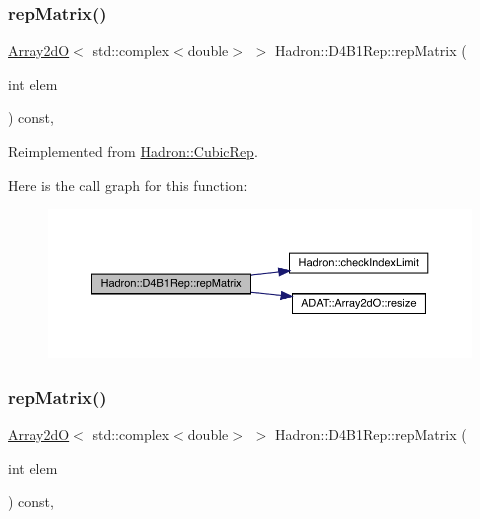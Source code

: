 \subsubsection{\texorpdfstring{repMatrix()}{repMatrix()}\hspace{0.1cm}{\footnotesize\ttfamily [1/2]}}
{\footnotesize\ttfamily \mbox{\hyperlink{classADAT_1_1Array2dO}{Array2dO}}$<$ std\+::complex$<$double$>$ $>$ Hadron\+::\+D4\+B1\+Rep\+::rep\+Matrix (\begin{DoxyParamCaption}\item[{int}]{elem }\end{DoxyParamCaption}) const\hspace{0.3cm}{\ttfamily [inline]}, {\ttfamily [virtual]}}



Reimplemented from \mbox{\hyperlink{structHadron_1_1CubicRep_ac5d7e9e6f4ab1158b5fce3e4ad9e8005}{Hadron\+::\+Cubic\+Rep}}.

Here is the call graph for this function\+:
\nopagebreak
\begin{figure}[H]
\begin{center}
\leavevmode
\includegraphics[width=350pt]{d6/d99/structHadron_1_1D4B1Rep_aaee6044952bae4a4d852115d4e1add07_cgraph}
\end{center}
\end{figure}
\mbox{\label{structHadron_1_1D4B1Rep_aaee6044952bae4a4d852115d4e1add07}} 
\subsubsection{\texorpdfstring{repMatrix()}{repMatrix()}\hspace{0.1cm}{\footnotesize\ttfamily [2/2]}}
{\footnotesize\ttfamily \mbox{\hyperlink{classADAT_1_1Array2dO}{Array2dO}}$<$ std\+::complex$<$double$>$ $>$ Hadron\+::\+D4\+B1\+Rep\+::rep\+Matrix (\begin{DoxyParamCaption}\item[{int}]{elem }\end{DoxyParamCaption}) const\hspace{0.3cm}{\ttfamily [inline]}, {\ttfamily [virtual]}}




